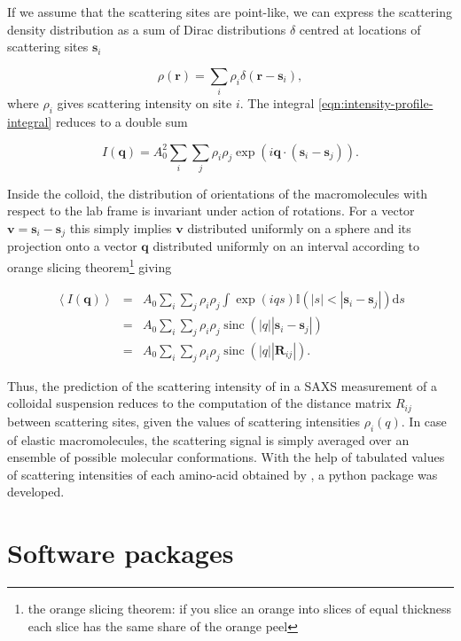 \documentclass{doctoral}
\newcommand{\dd}{\mathrm{d}}
\newcommand{\code}[1]{\texttt{\detokenize{#1}}}
\begin{document}
If we assume that the scattering sites are point-like, we can express the scattering density distribution as a sum of Dirac distributions $\delta$ centred at locations of scattering sites $\bm{s}_i$ 

\begin{equation}
    \rho(\bm{r}) = \sum_i \rho_i \delta(\bm{r}-\bm{s}_i),
\end{equation}
where $\rho_i$ gives scattering intensity on site $i$.
The integral \eqref{eqn:intensity-profile-integral} reduces to a double sum 

\begin{equation}
    I(\bm{q}) = A_0^2 \sum_i \sum_j \rho_i \rho_j \exp(i \bm{q} \cdot (\bm{s}_i - \bm{s}_j)).
\end{equation}

Inside the colloid, the distribution of orientations of the macromolecules with respect to the lab frame is invariant under action of rotations.
For a vector $\bm{v} = \bm{s}_i - \bm{s}_j$ this simply implies $\bm{v}$ distributed uniformly on a sphere and its projection onto a vector $\bm{q}$ distributed uniformly on an interval according to orange slicing theorem\footnote{the orange slicing theorem: if you slice an orange into slices of equal thickness each slice has the same share of the orange peel} giving 

\begin{eqnarray}
    \left< I(\bm{q}) \right> & = & A_0 \sum_i \sum_j \rho_i \rho_j \int \exp(i q s) \mathbb{I}(|s| < |\bm{s}_i - \bm{s}_j|) \dd s \\
                             & = & A_0 \sum_i \sum_j \rho_i \rho_j \operatorname{sinc}(|q||\bm{s}_i - \bm{s}_j|)                  \\
                             & = & A_0 \sum_i \sum_j \rho_i \rho_j \operatorname{sinc}(|q||\bm{R}_{ij}|).
\end{eqnarray}

Thus, the prediction of the scattering intensity of in a SAXS measurement of a colloidal suspension reduces to the computation of the distance matrix $R_{ij}$ between scattering sites, given the values of scattering intensities $\rho_i(q)$.
In case of elastic macromolecules, the scattering signal is simply averaged over an ensemble of possible molecular conformations.
With the help of tabulated values of scattering intensities of each amino-acid obtained by \textcite{Tong_2016}, a python package \code{saxs_single_bead} was developed.

\chapter{Software packages}
\end{document}
